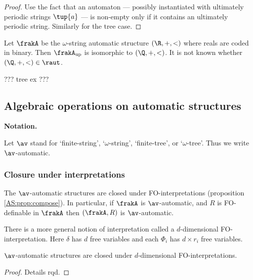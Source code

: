 \begin{proof}
Use the fact that an automaton --- possibly instantiated with ultimately periodic strings $\tup{a}$ --- is non-empty only if it contains an ultimately periodic string. Similarly for the tree case.
\end{proof}

Let $\frakA$ be the $\omega$-string automatic structure $(\R,+,<)$ where reals are coded in binary. 
Then $\frakA_{\rm{up}}$ is isomorphic to $(\Q,+,<)$. It is not known whether $(\Q,+,<) \in \raut$.

??? tree ex ???


\subsection{Algebraic operations on automatic structures}


{\bf Notation.}

  Let $\av$ stand for `finite-string', `$\omega$-string', `finite-tree', or `$\omega$-tree'.
Thus we write $\av$-automatic. 

\subsubsection{Closure under interpretations}

The $\av$-automatic structures are closed under FO-interpretations (proposition \ref{AS:prop:compose}).
In particular, if $\frakA$ is $\av$-automatic, and $R$ is FO-definable in $\frakA$ then $(\frakA,R)$ is $\av$-automatic.

There is a more general notion of interpretation called a $d$-dimensional FO-interpretation.
Here $\delta$ has $d$ free variables and each $\Phi_i$ has $d\times r_i$ free variables.

\begin{proposition}
$\av$-automatic structures are closed under $d$-dimensional FO-interpretations.
\end{proposition}

\begin{proof}
Details rqd.
\end{proof}

